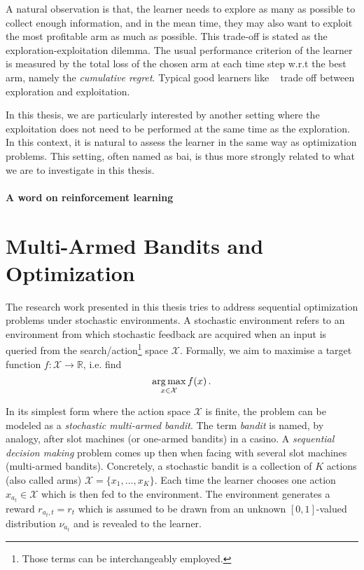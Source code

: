 A natural observation is that, the learner needs to explore as many as possible to collect enough information, and in the mean time, they may also want to exploit the most profitable arm as much as possible. This trade-off is stated as the \gls{exploration-exploitation dilemma}. The usual performance criterion of the learner is measured by the total loss of the chosen arm at each time step w.r.t the best arm, namely the \emph{cumulative regret}. Typical good learners like \UCB~\citep{auer2002ucb} trade off between exploration and exploitation. 

In this thesis, we are particularly interested by another setting where the exploitation does not need to be performed at the same time as the exploration. In this context, it is natural to assess the learner in the same way as optimization problems. This setting, often named as \gls{bai}, is thus more strongly related to what we are to investigate in this thesis.

\paragraph{A word on reinforcement learning}

\section{Multi-Armed Bandits and Optimization}\label{sec:intro.mab}
    
The research work presented in this thesis tries to address sequential optimization problems under stochastic environments. A stochastic environment refers to an environment from which stochastic feedback are acquired when an input is queried from the search/action\footnote{Those terms can be interchangeably employed.} space $\mathcal{X}$. Formally, we aim to maximise a target function $f:\mathcal{X}\rightarrow\mathbb{R}$, i.e. find 
\begin{equation}\label{eq:optim}
    \operatorname*{arg\,max}_{x\in\mathcal{X}} f(x)\,.
\end{equation}

In its simplest form where the action space $\mathcal{X}$ is finite, the problem can be modeled as a \emph{stochastic multi-armed bandit}. The term \emph{bandit} is named, by analogy, after slot machines (or one-armed bandits) in a casino. A \emph{sequential decision making} problem comes up then when facing with several slot machines (multi-armed bandits). Concretely, a stochastic bandit is a collection of $K$ actions (also called arms) $\mathcal{X} = \{x_1,\ldots,x_K\}$. Each time the learner chooses one action $x_{a_t}\in\mathcal{X}$ which is then fed to the environment. The environment generates a reward $r_{a_t,t}=r_t$ which is assumed to be drawn from an unknown $[0,1]$-valued distribution $\nu_{a_t}$ and is revealed to the learner.

